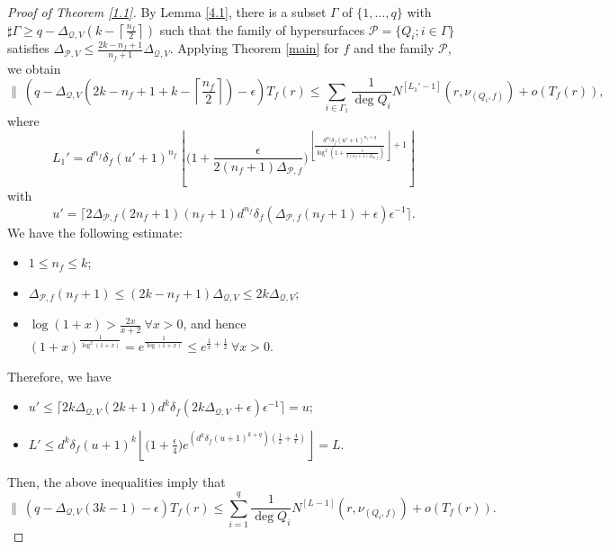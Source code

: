 \documentclass[12pt,leqno]{amsart}
\numberwithin{equation}{section}
\begin{document}
\begin{proof}[Proof of Theorem \ref{1.1}]
By Lemma \ref{4.1},  there is a subset $\Gamma$ of $\{1,\ldots,q\}$ with $\sharp\Gamma\ge q -\Delta_{\mathcal Q,V}\left(k-\left\lceil\frac{n_f}{2}\right\rceil\right)$ such that the family of hypersurfaces $\mathcal P=\{Q_i;i\in\Gamma\}$ satisfies $\Delta_{\mathcal P,V}\le \frac{2k-n_f+1}{n_f+1}\Delta_{\mathcal Q,V}$. Applying Theorem \ref{main} for $f$ and the family $\mathcal P$, we obtain
$$\biggl \|\ (q -\Delta_{\mathcal Q,V}\left(2k-n_f+1+k-\left\lceil\frac{n_f}{2}\right\rceil\right)-\epsilon)T_f(r)\le\sum_{i\in\Gamma_1}\frac{1}{\deg Q_i}N^{[L_1'-1]}(r,\nu_{(Q_i,f)})+o(T_f(r)),$$
where 
$$L_1'=d^{n_f}\delta_f(u'+1)^{n_f}\left\lfloor\bigl(1+\frac{\epsilon}{2(n_f+1)\Delta_{\mathcal P,f}}\bigl)^{\left\lfloor\frac{d^{n_f}\delta_f(u'+1)^{n_f+q}}{\log^2(1+\frac{\epsilon}{2(n_f+1)\Delta_{\mathcal P,f}})}\right\rfloor+1}\right\rfloor$$
with
$$u'=\lceil 2\Delta_{\mathcal P,f}(2n_f+1)(n_f+1)d^{n_f}\delta_f(\Delta_{\mathcal P,f}(n_f+1)+\epsilon)\epsilon^{-1}\rceil.$$
We have the following estimate:
\begin{itemize}
\item $1\le n_f\le k$;
\item $\Delta_{\mathcal P,f}(n_f+1)\le (2k-n_f+1)\Delta_{\mathcal Q,V}\le 2k\Delta_{\mathcal Q,V}$;
\item $\log (1+x)>\frac{2x}{x+2}\ \forall x>0$, and hence $(1+x)^{\frac{1}{\log^2(1+x)}}=e^{\frac{1}{\log (1+x)}}\le e^{\frac{1}{x}+\frac{1}{2}}\ \forall x>0$.
\end{itemize}
Therefore, we have
\begin{itemize}
\item $u'\le \lceil 2k\Delta_{\mathcal Q,V}(2k+1)d^{k}\delta_f(2k\Delta_{\mathcal Q,V}+\epsilon)\epsilon^{-1}\rceil=u;$
\item $L'\le d^{k}\delta_f(u+1)^{k}\left\lfloor\bigl(1+\frac{\epsilon}{4}\bigl)e^{\left(d^k\delta_f(u+1)^{k+q}\right)\left(\frac{1}{2}+\frac{4}{\epsilon}\right)}\right\rfloor=L.$
\end{itemize}
Then, the above inequalities imply that
$$\biggl \|\ \left (q -\Delta_{\mathcal Q,V}(3k-1)-\epsilon\right)T_f(r)\le\sum_{i=1}^q\frac{1}{\deg Q_i}N^{[L-1]}(r,\nu_{(Q_i,f)})+o(T_f(r)).$$


\end{proof}
\end{document}
